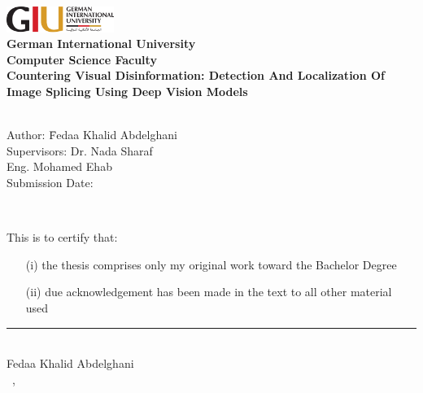 \newcommand{\titlePage}{

\thispagestyle{empty}
\begin{center}
	\includegraphics[width=3.5cm]{figures/giu_logo.png}\\[2mm]
	\textbf{German International University}\\[2mm]
		\textbf{Computer Science Faculty}\\[1mm]

	
	\vspace{2cm}
	\doublespacing
	{\Huge \textbf{Countering Visual Disinformation: Detection And Localization Of Image Splicing Using Deep Vision Models}}\\
	\singlespacing
	\vspace{2cm}
	{\large \textbf{\typeOfThesis}}\\
	
	\vfill
	\parbox{1cm}{
  		\begin{large}
    			\begin{tabbing}
       			Author: \hspace{2cm}  
        			\= Fedaa Khalid Abdelghani \\[2mm]
      			Supervisors: 
        			\> Dr. Nada Sharaf\\[2mm]
				\> Eng. Mohamed Ehab\\[2mm]
      			Submission Date: 
        			\>\submissionDate\\
    			\end{tabbing}
  		\end{large}
	}\\
\end{center}
\clearpage
}
\titlePage 
\thispagestyle{empty}
This is to certify that:
\begin{itemize}
\item[(i)] the thesis comprises only my original work toward the Bachelor Degree
\item[(ii)] due acknowledgement has been made in the text to all other material used
\end{itemize}

\vspace{2cm}
\begin{flushright}
\rule[0mm]{6cm}{0.2mm}\\
Fedaa Khalid Abdelghani\\ 
\submissionDay~\submissionMonth,~\submissionYear\\
\end{flushright}
\clearpage
